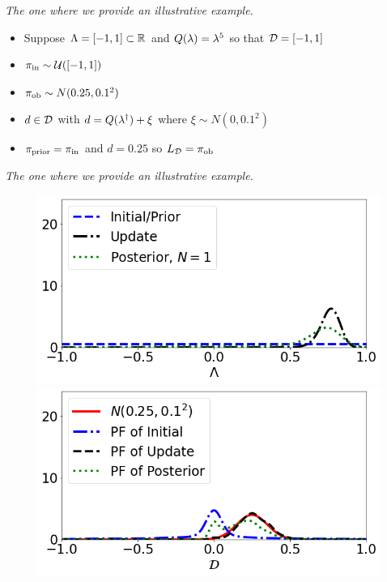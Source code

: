 \begin{frame}{\it The one where we provide an illustrative example.}

\begin{itemize}
\item Suppose ${\Lambda} = [-1,1] \subset \mathbb{R}$ and $Q(\lambda)=\lambda^5$ so that $\mathcal{D} = [-1,1]$

\bigskip
\item $\operatorname*{\pi_{in}} \sim \mathcal{U}([-1,1])$

\bigskip
\item $\operatorname*{\pi_{ob}} \sim N(0.25,0.1^2)$

\bigskip
\bigskip
\item $d\in \mathcal{D}$ with $d=Q(\lambda^\dagger)+\xi$ where $\xi\sim N(0,0.1^2)$

\bigskip
\item $\operatorname*{\pi_{prior}} = \operatorname*{\pi_{in}}$ and $d=0.25$ so $L_{\mathcal{D}} = \operatorname*{\pi_{ob}}$
\end{itemize}

\end{frame}


\begin{frame}{\it The one where we provide an illustrative example.}

\begin{figure}
\centering
\vbox{
   \includegraphics[width=0.6\linewidth]{figures/bip-vs-sip-1.png}
   \includegraphics[width=0.6\linewidth]{figures/bip-vs-sip-pf-1.png}
}
 \label{fig:bayes-comparison}
\end{figure}

\end{frame}


